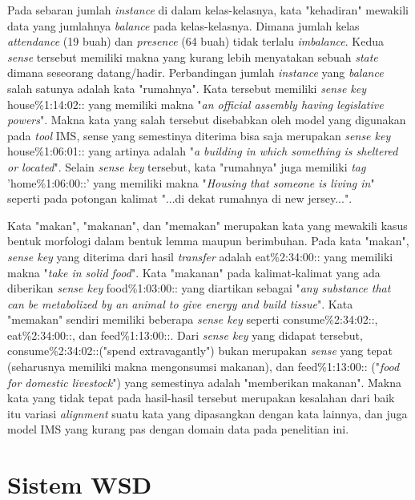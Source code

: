 Pada sebaran jumlah \textit{instance} di dalam kelas-kelasnya, kata "kehadiran" mewakili data yang jumlahnya \textit{balance} pada kelas-kelasnya. Dimana jumlah kelas \textit{attendance} (19 buah) dan \textit{presence} (64 buah) tidak terlalu \textit{imbalance}. Kedua \textit{sense} tersebut memiliki makna yang kurang lebih menyatakan sebuah \textit{state} dimana seseorang datang/hadir. Perbandingan jumlah \textit{instance} yang \textit{balance} salah satunya adalah kata "rumahnya". Kata tersebut memiliki \textit{sense key} house\%1:14:02:: yang memiliki makna "\textit{an official assembly having legislative powers}". Makna kata yang salah tersebut disebabkan oleh model yang digunakan pada \textit{tool} IMS, sense yang semestinya diterima bisa saja merupakan \textit{sense key} house\%1:06:01:: yang artinya adalah "\textit{a building in which something is sheltered or located}". Selain \textit{sense key} tersebut, kata "rumahnya" juga memiliki \textit{tag} 'home\%1:06:00::' yang memiliki makna "\textit{Housing that someone is living in}" seperti pada potongan kalimat "...di dekat rumahnya di new jersey...".

Kata "makan", "makanan", dan "memakan" merupakan kata yang mewakili kasus bentuk morfologi dalam bentuk lemma maupun berimbuhan. Pada kata "makan", \textit{sense key} yang diterima dari hasil \textit{transfer} adalah eat\%2:34:00:: yang memiliki makna "\textit{take in solid food}". Kata "makanan" pada kalimat-kalimat yang ada diberikan \textit{sense key} food\%1:03:00:: yang diartikan sebagai "\textit{any substance that can be metabolized by an animal to give energy and build tissue}". Kata "memakan" sendiri memiliki beberapa \textit{sense key} seperti consume\%2:34:02::, eat\%2:34:00::, dan feed\%1:13:00::. Dari \textit{sense key} yang didapat tersebut, consume\%2:34:02::("spend extravagantly") bukan merupakan \textit{sense} yang tepat (seharusnya memiliki makna mengonsumsi makanan), dan feed\%1:13:00:: ("\textit{food for domestic livestock}") yang semestinya adalah "memberikan makanan". Makna kata yang tidak tepat pada hasil-hasil tersebut merupakan kesalahan dari baik itu variasi \textit{alignment} suatu kata yang dipasangkan dengan kata lainnya, dan juga model IMS yang kurang pas dengan domain data pada penelitian ini.

\section{Sistem WSD}

